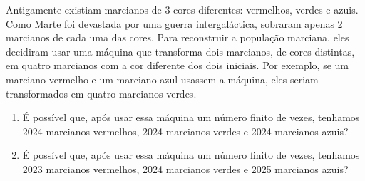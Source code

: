\begin{problem}
Antigamente existiam marcianos de 3 cores diferentes: vermelhos, verdes e azuis. Como Marte foi devastada por uma guerra intergaláctica, sobraram apenas 2 marcianos de cada uma das cores. Para reconstruir a população marciana, eles decidiram usar uma máquina que transforma dois marcianos, de cores distintas, em quatro marcianos com a cor diferente dos dois iniciais. Por exemplo, se um marciano vermelho e um marciano azul usassem a máquina, eles seriam transformados em quatro marcianos verdes.
\begin{enumerate}
\item[(a)] É possível que, após usar essa máquina um número finito de vezes, tenhamos
2024 marcianos vermelhos, 2024 marcianos verdes e 2024 marcianos azuis?
\item[(b)] É possível que, após usar essa máquina um número finito de vezes, tenhamos
2023 marcianos vermelhos, 2024 marcianos verdes e 2025 marcianos azuis?
\end{enumerate}
\end{problem}
